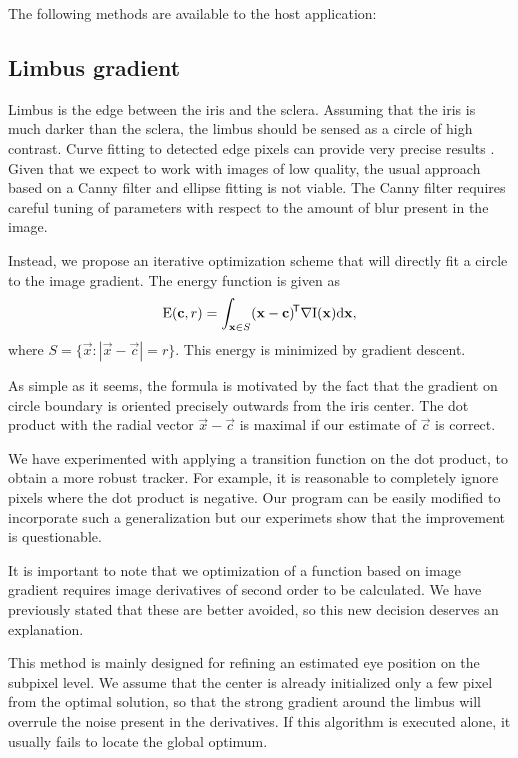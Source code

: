 The following methods are available to the host application:

\subsection{Limbus gradient}
Limbus is the edge between the iris and the sclera.
Assuming that the iris is much darker than the sclera, the limbus should be sensed as a circle of high contrast.
Curve fitting to detected edge pixels can provide very precise results \cite{kassner14}.
Given that we expect to work with images of low quality, the usual approach based on a Canny filter and ellipse fitting is not viable.
The Canny filter requires careful tuning of parameters with respect to the amount of blur present in the image.

Instead, we propose an iterative optimization scheme that will directly fit a circle to the image gradient.
The energy function is given as
\begin{equation}
\mathrm{E}(\mathbf{c}, r) = \int_{\mathbf{x} \in S} (\mathbf{x} - \mathbf{c})^{\!\mathsf{T}} \nabla \mathrm{I} (\mathbf{x}) \mathrm{d}\mathbf{x},
\end{equation}
where $S = \{\vec x : |\vec x - \vec c| = r\}.$
This energy is minimized by gradient descent.

As simple as it seems, the formula is motivated by the fact that the gradient on circle boundary is oriented precisely outwards from the iris center.
The dot product with the radial vector $\vec x - \vec c$ is maximal if our estimate of $\vec c$ is correct.

We have experimented with applying a transition function on the dot product, to obtain a more robust tracker.
For example, it is reasonable to completely ignore pixels where the dot product is negative.
Our program can be easily modified to incorporate such a generalization but our experimets show that the improvement is questionable.

It is important to note that we optimization of a function based on image gradient requires image derivatives of second order to be calculated.
We have previously stated that these are better avoided, so this new decision deserves an explanation.

This method is mainly designed for refining an estimated eye position on the subpixel level.
We assume that the center is already initialized only a few pixel from the optimal solution, so that the strong gradient around the limbus will overrule the noise present in the derivatives.
If this algorithm is executed alone, it usually fails to locate the global optimum.

